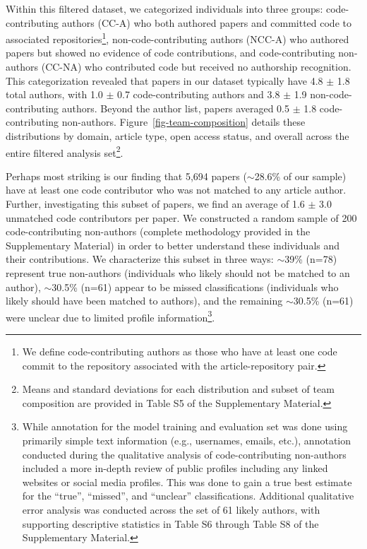 \documentclass[
  number,
  3p,
  onecolumn]{elsarticle}
\begin{document}
Within this filtered dataset, we categorized individuals into three
groups: code-contributing authors (CC-A) who both authored papers and
committed code to associated repositories\footnote{We define
  code-contributing authors as those who have at least one code commit
  to the repository associated with the article-repository pair.},
non-code-contributing authors (NCC-A) who authored papers but showed no
evidence of code contributions, and code-contributing non-authors
(CC-NA) who contributed code but received no authorship recognition.
This categorization revealed that papers in our dataset typically have
4.8 $\pm$ 1.8 total authors, with 1.0 $\pm$ 0.7 code-contributing authors and
3.8 $\pm$ 1.9 non-code-contributing authors. Beyond the author list, papers
averaged 0.5 $\pm$ 1.8 code-contributing non-authors.
Figure~\ref{fig-team-composition} details these distributions by domain,
article type, open access status, and overall across the entire filtered
analysis set\footnote{Means and standard deviations for each
  distribution and subset of team composition are provided in Table S5
  of the Supplementary Material.}.

Perhaps most striking is our finding that 5,694 papers
($\sim$28.6\% of our sample) have at least one code contributor
who was not matched to any article author. Further, investigating this
subset of papers, we find an average of 1.6 $\pm$ 3.0 unmatched code
contributors per paper. We constructed a random sample of 200
code-contributing non-authors (complete methodology provided in the
Supplementary Material) in order to better understand these individuals
and their contributions. We characterize this subset in three ways:
$\sim$39\% (n=78) represent true non-authors (individuals who
likely should not be matched to an author), $\sim$30.5\% (n=61)
appear to be missed classifications (individuals who likely should have
been matched to authors), and the remaining $\sim$30.5\% (n=61)
were unclear due to limited profile information\footnote{While
  annotation for the model training and evaluation set was done using
  primarily simple text information (e.g., usernames, emails, etc.),
  annotation conducted during the qualitative analysis of
  code-contributing non-authors included a more in-depth review of
  public profiles including any linked websites or social media
  profiles. This was done to gain a true best estimate for the ``true'',
  ``missed'', and ``unclear'' classifications. Additional qualitative
  error analysis was conducted across the set of 61 likely authors, with
  supporting descriptive statistics in Table S6 through Table S8 of the
  Supplementary Material.}.
\end{document}
